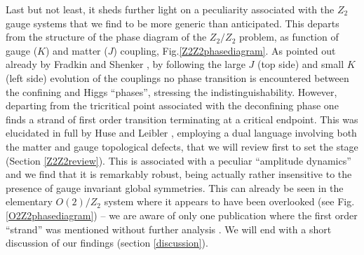 Last but not least, it sheds further light on a peculiarity associated with the $Z_2$ gauge systems that we find to be more generic than anticipated. This departs from the structure of the phase diagram of the $Z_2/Z_2$ problem,  as function of gauge ($K$) and matter ($J$) coupling, Fig.\ref{Z2Z2phasediagram}. As pointed out already by Fradkin and Shenker \cite{Fradkinshenker}, by following the large $J$ (top side) and small $K$ (left side) evolution of the couplings no phase transition is encountered between the confining and Higgs ``phases'', stressing the indistinguishability. However, departing from the tricritical point associated with the deconfining phase one finds a strand of first order transition terminating at a critical endpoint. This was elucidated in full by Huse and Leibler \cite{HuseLeibler}, employing a dual language involving both the matter and gauge topological defects, that we will review first  to set the stage (Section \ref{Z2Z2review}). This is associated with a peculiar ``amplitude dynamics''  and we find that it is remarkably robust, being actually rather insensitive to the presence of gauge invariant global symmetries. This can already be seen in the elementary $O(2)/Z_2$ system where it appears to have been overlooked (see Fig. \ref{O2Z2phasediagram}) -- we are aware of only one publication where the first order ``strand'' was mentioned without further analysis \cite{Senthil}. We will end with a short discussion of our findings (section \ref{discussion}). 



